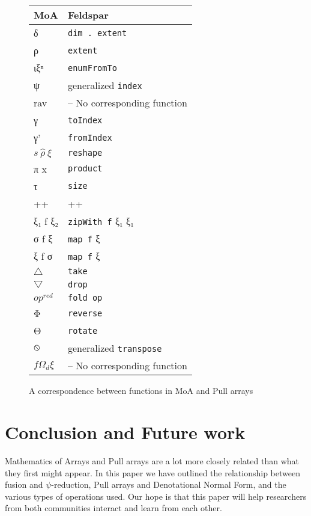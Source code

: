 \documentclass[preprint]{sigplanconf}
\begin{document}
\begin{figure}
\begin{center}
\begin{tabular}{|@{}l|l@{}|}
\hline
MoA & Feldspar
\\
\hline
δ & \verb!dim . extent!
\\
ρ & \verb!extent!
\\
ιξⁿ & \verb!enumFromTo!
\\
ψ & generalized \verb!index!
\\
rav & -- No corresponding function
\\
γ & \verb!toIndex!
\\
γ' & \verb!fromIndex!
\\
$s \: \hat{ρ} \: ξ$ & \verb!reshape!
\\
π x & \verb!product!
\\
τ & \verb!size!
\\
++ & ++
\\
ξ₁ f ξ₂ & \verb!zipWith f! ξ₁ ξ₁
\\
σ f ξ & \verb!map f! ξ
\\
ξ f σ & \verb!map f! ξ
\\
$\bigtriangleup$ & \verb!take!
\\
$\bigtriangledown$ & \verb!drop!
\\
$op^{red}$ & \verb!fold op!
\\
Φ & \verb!reverse!
\\
Θ & \verb!rotate!
\\
$\varobslash$ & generalized \verb!transpose!
\\
$f Ω_d ξ$ & -- No corresponding function
\\
\hline
\end{tabular}
\end{center}
\caption{A correspondence between functions in MoA and Pull arrays}
\label{fig:rosetta}
\end{figure}

\section{Conclusion and Future work}

Mathematics of Arrays and Pull arrays are a lot more closely related
than what they first might appear. In this paper we have outlined the
relationship between fusion and \(\psi\)-reduction, Pull arrays and
Denotational Normal Form, and the various types of operations used.
Our hope is that this paper will help researchers from both
communities interact and learn from each other.
\end{document}

